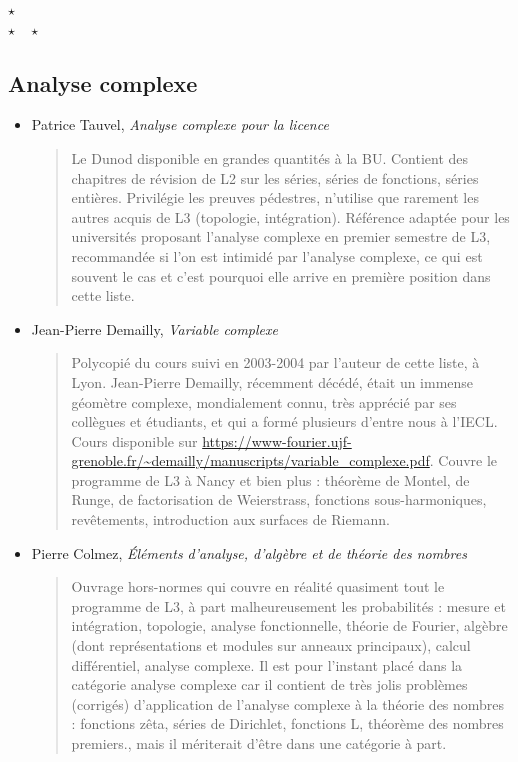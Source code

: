 \documentclass{article}
\def\separateur{\begin{center}
$\star$\\
$\star\quad\star$
\end{center}}
\begin{document}
\separateur
\subsection{Analyse complexe}

\begin{mdframed}
\begin{itemize}
\item Patrice Tauvel, \emph{Analyse complexe pour la licence}
\begin{quote}
Le \og Dunod\fg{} disponible en grandes quantités à la BU. Contient des chapitres de révision de L2 sur les séries, séries de fonctions, séries entières. Privilégie les preuves pédestres, n'utilise que rarement les autres acquis de L3 (topologie, intégration).  Référence adaptée pour les universités proposant l'analyse complexe en premier semestre de L3, recommandée si l'on est intimidé par l'analyse complexe, ce qui est souvent le cas et c'est pourquoi elle arrive en première position dans cette liste.
\end{quote}
\end{itemize}
\end{mdframed}
\begin{itemize}
\item Jean-Pierre Demailly, \emph{Variable complexe}
\begin{quote}
Polycopié du cours suivi en 2003-2004 par l'auteur de cette liste, à Lyon.
Jean-Pierre Demailly, récemment décédé, était un immense géomètre complexe, mondialement connu, très apprécié par ses collègues et étudiants, et qui a formé plusieurs d'entre nous à l'IECL. Cours disponible sur \url{https://www-fourier.ujf-grenoble.fr/~demailly/manuscripts/variable_complexe.pdf}. Couvre le programme de L3 à Nancy et bien plus : théorème de Montel, de Runge, de factorisation de Weierstrass, fonctions sous-harmoniques, revêtements, introduction aux surfaces de Riemann.
\end{quote}
\item Pierre Colmez, \emph{Éléments d'analyse, d'algèbre et de théorie des nombres}
\begin{quote}
Ouvrage hors-normes qui couvre en réalité quasiment tout le programme de L3, à part malheureusement les probabilités : mesure et intégration, topologie, analyse fonctionnelle, théorie de Fourier, algèbre (dont représentations et modules sur anneaux principaux), calcul différentiel, analyse complexe. Il est pour l'instant placé dans la catégorie analyse complexe car il contient de très jolis problèmes (corrigés) d'application de l'analyse complexe à la théorie des nombres : fonctions zêta, séries de Dirichlet, fonctions L, théorème des nombres premiers., mais il mériterait d'être dans une catégorie à part.
\end{quote}
\end{itemize}
\end{document}
